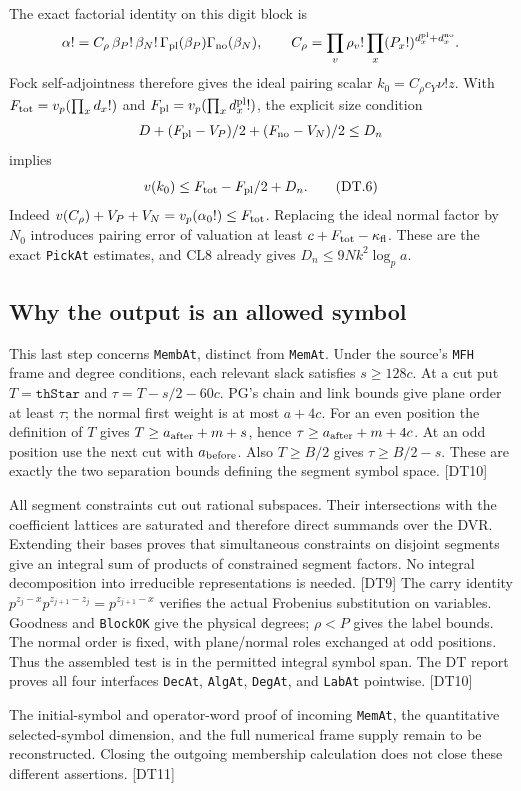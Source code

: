 The exact factorial identity on this digit block is
\[
 \alpha!=C_\rho\,\beta_P!\,\beta_N!\,
       \Gamma_{\rm pl}(\beta_P)\Gamma_{\rm no}(\beta_N),\qquad
 C_\rho=\prod_v\rho_v!\prod_x(P_x!)^{d_x^{\rm pl}+d_x^{\rm no}}.
\]
Fock self-adjointness therefore gives the ideal pairing scalar
$k_0=C_\rho c_Y\nu!z$. With $F_{\rm tot}=v_p(\prod_xd_x!)$ and
$F_{\rm pl}=v_p(\prod_xd_x^{\rm pl}!)$, the explicit size condition
\[
 D+(F_{\rm pl}-V_P)/2+(F_{\rm no}-V_N)/2\le D_n
\]
implies
\[
 v(k_0)\le F_{\rm tot}-F_{\rm pl}/2+D_n.
 \tag{DT.6}
\]
Indeed $v(C_\rho)+V_P+V_N=v_p(\alpha_0!)\le F_{\rm tot}$. Replacing the ideal normal factor by $N_0$ introduces pairing error of valuation at least $c+F_{\rm tot}-\kappa_{\rm fl}$. These are the exact \texttt{PickAt} estimates, and CL8 already gives $D_n\le9Nk^2\log_p a$.

\subsection{Why the output is an allowed symbol}

This last step concerns \texttt{MembAt}, distinct from \texttt{MemAt}. Under the source's \texttt{MFH} frame and degree conditions, each relevant slack satisfies $s\ge128c$.
At a cut put $T=\texttt{thStar}$ and $\tau=T-s/2-60c$.
PG's chain and link bounds give plane order at least $\tau$; the normal first weight is at most $a+4c$.
For an even position the definition of $T$ gives $T\ge a_{\rm after}+m+s$, hence $\tau\ge a_{\rm after}+m+4c$. At an odd position use the next cut with $a_{\rm before}$. Also $T\ge B/2$ gives $\tau\ge B/2-s$. These are exactly the two separation bounds defining the segment symbol space. \textsf{[DT10]}

All segment constraints cut out rational subspaces. Their intersections with the coefficient lattices are saturated and therefore direct summands over the DVR. Extending their bases proves that simultaneous constraints on disjoint segments give an integral sum of products of constrained segment factors. No integral decomposition into irreducible representations is needed. \textsf{[DT9]}
The carry identity $p^{z_j-x}p^{z_{j+1}-z_j}=p^{z_{j+1}-x}$ verifies the actual Frobenius substitution on variables. Goodness and \texttt{BlockOK} give the physical degrees; $\rho<P$ gives the label bounds. The normal order is fixed, with plane/normal roles exchanged at odd positions. Thus the assembled test is in the permitted integral symbol span. The DT report proves all four interfaces \texttt{DecAt}, \texttt{AlgAt}, \texttt{DegAt}, and \texttt{LabAt} pointwise. \textsf{[DT10]}

The initial-symbol and operator-word proof of incoming \texttt{MemAt}, the quantitative selected-symbol dimension, and the full numerical frame supply remain to be reconstructed. Closing the outgoing membership calculation does not close these different assertions. \textsf{[DT11]}
